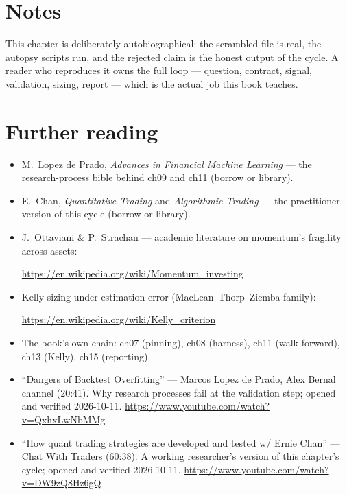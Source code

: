 \section*{Notes}
This chapter is deliberately autobiographical: the scrambled
file is real, the autopsy scripts run, and the rejected claim is
the honest output of the cycle. A reader who reproduces it owns
the full loop --- question, contract, signal, validation,
sizing, report --- which is the actual job this book teaches.

\section*{Further reading}
\begin{itemize}
\item M.~Lopez de Prado, \emph{Advances in Financial Machine
Learning} --- the research-process bible behind ch09 and ch11
(borrow or library).
\item E.~Chan, \emph{Quantitative Trading} and
\emph{Algorithmic Trading} --- the practitioner version of this
cycle (borrow or library).
\item J.~Ottaviani \& P.~Strachan --- academic literature on
momentum's fragility across assets:

\url{https://en.wikipedia.org/wiki/Momentum_investing}
\item Kelly sizing under estimation error (MacLean--Thorp--Ziemba
family):

\url{https://en.wikipedia.org/wiki/Kelly_criterion}
\item The book's own chain: ch07 (pinning), ch08 (harness),
ch11 (walk-forward), ch13 (Kelly), ch15 (reporting).
\end{itemize}

\begin{rulebox}
\begin{itemize}
\item ``Dangers of Backtest Overfitting'' --- Marcos Lopez de
Prado, Alex Bernal channel (20:41). Why research processes
fail at the validation step; opened and verified 2026-10-11.
\url{https://www.youtube.com/watch?v=QxhxLwNbMMg}
\item ``How quant trading strategies are developed and tested
w/ Ernie Chan'' --- Chat With Traders (60:38). A working
researcher's version of this chapter's cycle; opened and
verified 2026-10-11.
\url{https://www.youtube.com/watch?v=DW9zQ8Hz6gQ}
\end{itemize}
\end{rulebox}

